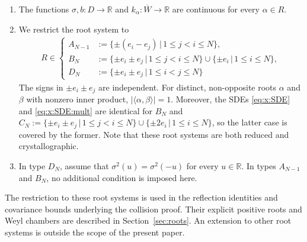 \documentclass{article}
\numberwithin{equation}{section}
\newcommand{\R}{\mathbb{R}}
\newcommand{\cond}[1]{\, #1 \vert \,}
\newcommand{\Cc}{\overline{W}}
\newcommand{\domain}{D}
\theoremstyle{plain}
\begin{document}
\begin{enumerate}[label=(G\arabic*), leftmargin=2cm]
    \item \label{ass:sigma:b:continuous} 
    The functions $\sigma, b:\domain \to \R$ and $k_\alpha:\Cc\to \R$ are continuous for every $\alpha\in R$. 

    \item \label{ass:R:root system} 
    We restrict the root system to \begin{align*}
        R\in \begin{cases}
            A_{N-1}&:=\{\pm(e_i-e_j) \cond{} 1\leq j< i\leq N\},\\
            B_N&:=\{\pm e_i\pm e_j \cond{} 1\leq j< i\leq N\}\cup \{\pm e_i \cond{}1\leq i \leq N \},\\
            D_N&:= \{\pm e_i\pm e_j \cond{}1 \leq i< j\leq N\}
        \end{cases}
    \end{align*}
    The signs in $\pm e_i\pm e_j$ are independent. For distinct, non-opposite roots $\alpha$ and $\beta$ with nonzero inner product, $|\langle\alpha,\beta\rangle|=1$. 
    Moreover, the SDEs \eqref{eq:x:SDE} and \eqref{eq:x:SDE:mult} are identical for $B_N$ and $C_N:=\{\pm e_i\pm e_j \cond{} 1\leq j< i\leq N\}\cup \{\pm 2e_i \cond{}1\leq i \leq N \}$, so the latter case is covered by the former. Note that these root systems are both reduced and crystallographic.
    \item \label{ass:variance:compatibility}
    In type $D_N$, assume that $\sigma^2(u)=\sigma^2(-u)$ for every $u\in\mathbb R$. In types $A_{N-1}$ and $B_N$, no additional condition is imposed here.
\end{enumerate}
    The restriction to these root systems is used in the reflection identities and covariance bounds underlying the collision proof. Their explicit positive roots and Weyl chambers are described in Section~\ref{sec:roots}. An extension to other root systems is outside the scope of the present paper.
\end{document}
